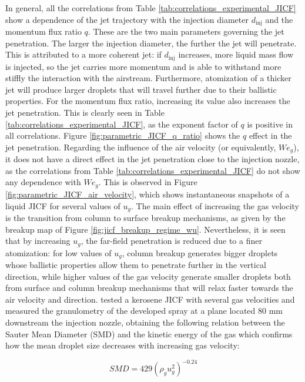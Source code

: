 In general, all the correlations from Table \ref{tab:correlations_experimental_JICF} show a dependence of the jet trajectory with the injection diameter $d_\mathrm{inj}$ and the momentum flux ratio $q$. These are the two main parameters governing the jet penetration. The larger the injection diameter, the further the jet will penetrate. This is attributed to a more coherent jet: if $d_\mathrm{inj}$ increases, more liquid mass flow is injected, so the jet carries more momentum and is able to withstand more stiffly the
interaction with the airstream. Furthermore, atomization of a thicker jet will produce larger droplets that
will travel further due to their ballistic properties. For the momentum flux ratio, increasing its value also increases the jet penetration. This is clearly seen in Table \ref{tab:correlations_experimental_JICF}, as the exponent factor of $q$ is positive in all correlations. Figure \ref{fig:parametric_JICF_q_ratio} shows the $q$ effect in the jet penetration. Regarding the influence of the air velocity (or equivalently, $We_g$), it does not have a direct effect in the jet penetration close to the injection nozzle, as the correlations from Table \ref{tab:correlations_experimental_JICF} do not show any dependence with $We_g$. This is observed in Figure \ref{fig:parametric_JICF_air_velocity}, which shows instantaneous snapshots of a liquid JICF for several values of $u_g$. The main effect of increasing the gas velocity is the transition from column to surface breakup mechanisms, as given by the breakup map of Figure \ref{fig:jicf_breakup_regime_wu}. Nevertheless, it is seen that by increasing $u_g$, the far-field penetration is reduced due to a finer atomization: for low values of $u_g$, column breakup generates bigger droplets whose ballistic properties allow them to penetrate further in the vertical direction, while higher values of the gas velocity generate smaller droplets both from surface and column breakup mechanisms that will relax faster towards the air velocity and direction.  tested a kerosene JICF with several gas velocities and measured the granulometry of the developed spray at a plane located 80 mm downstream the injection nozzle, obtaining the following relation between the Sauter Mean Diameter (SMD) and the kinetic energy of the gas which confirms how the mean droplet size decreases with increasing gas velocity:

\begin{equation}
SMD = 429 \left( \rho_g u_g^2 \right)^{-0.24}
\end{equation}



